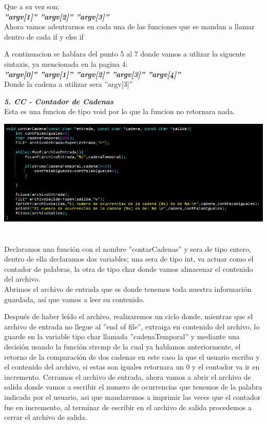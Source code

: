 \documentclass[12pt,letterpaper]{report}
\begin{document}
Que a su vez son;\\

\textbf{\textit{''argv[1]''  ''argv[2]''  ''argv[3]''}}\\

Ahora vamos adentrarnos en cada una de las funciones que se mandan a llamar dentro de cada if y else if

A continuacion se hablara del punto 5 al 7 donde vamos a utlizar la siguente sintaxis, ya mencionada en la pagina 4:\\

\textbf{\textit{ ''argv[0]''  ''argv[1]''  ''argv[2]''  ''argv[3]''  ''argv[4]'' }}\\

Donde la cadena a utilizar sera ''argv[3]''

\newpage
\textbf{\textit{ 5. CC - Contador de Cadenas}}\\

Esta es una funcion de tipo void por lo que la funcion no retornara nada.
\begin{multicols}{2}
\includegraphics[scale=0.42]{punto5}\\\\
\\Declaramos una función con el nombre ''contarCadenas'' y sera de tipo entero, dentro de ella declaramos dos variables; una sera de tipo int, va actuar como el contador de palabras, la otra de tipo char donde vamos almacenar el contenido del archivo.\\
Abrimos el archivo de entrada que es donde tenemos toda nuestra información guardada, así que vamos a leer su contenido.
\end{multicols}
Después de haber leído el archivo, realizaremos un ciclo donde, mientras que el archivo de entrada no llegue al ''end of file'', extraiga en contenido del archivo, lo guarde en la variable tipo char llamada ''cadenaTemporal'' y mediante una decisión usando la función strcmp de la cual ya hablamos anteriormente, el retorno de la comparación de dos cadenas en este caso la que el usuario escriba y el contenido del archivo, si estas son iguales retornara un 0 y el contador va ir en incremento. Cerramos el archivo de entrada, ahora vamos a abrir el archivo de salida donde vamos a escribir el numero de ocurrencias que tenemos de la palabra indicada por el usuario, asi que mandaremos a imprimir las veces que el contador fue en incremento, al terminar de escribir en el archivo de salida procedemos a cerrar el archivo de salida.\\
\end{document}
